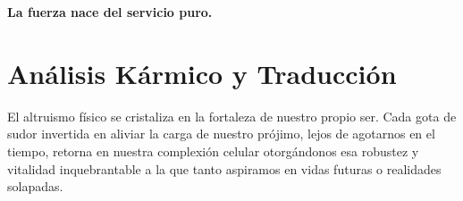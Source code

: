 \vspace{1em}
\begin{center}
    \textbf{\Large La fuerza nace del servicio puro.}
\end{center}
\vspace{1em}

\section{Análisis Kármico y Traducción}
\begin{figure}
  \vspace{-1.5em}
  \begin{center}
  \end{center}
  \vspace{-1.5em}
\end{figure}
El altruismo físico se cristaliza en la fortaleza de nuestro propio ser. Cada gota de sudor invertida en aliviar la carga de nuestro prójimo, lejos de agotarnos en el tiempo, retorna en nuestra complexión celular otorgándonos esa robustez y vitalidad inquebrantable a la que tanto aspiramos en vidas futuras o realidades solapadas.

